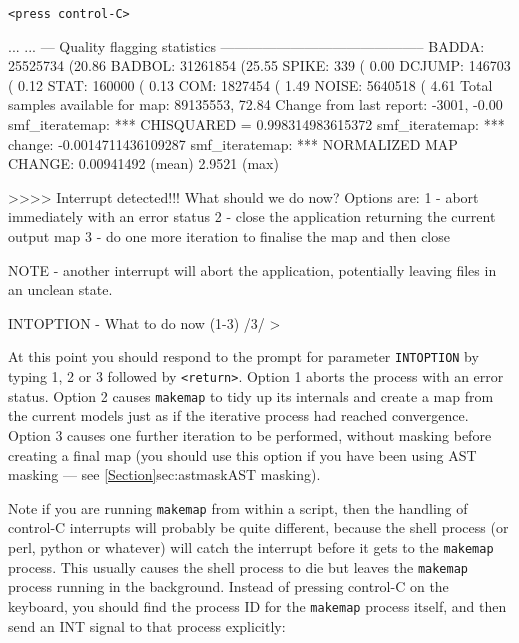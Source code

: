\begin{terminalv}
\texttt{<press control-C>}

\begin{terminalv}
...
...
--- Quality flagging statistics
--------------------------------------------
 BADDA:   25525734 (20.86%
BADBOL:   31261854 (25.55%
 SPIKE:        339 ( 0.00%
DCJUMP:     146703 ( 0.12%
  STAT:     160000 ( 0.13%
   COM:    1827454 ( 1.49%
 NOISE:    5640518 ( 4.61%
Total samples available for map:   89135553, 72.84%
     Change from last report:      -3001, -0.00%
smf_iteratemap: *** CHISQUARED = 0.998314983615372
smf_iteratemap: *** change: -0.0014711436109287
smf_iteratemap: *** NORMALIZED MAP CHANGE: 0.00941492 (mean) 2.9521 (max)


>>>> Interrupt detected!!! What should we do now? Options are:
1 - abort immediately with an error status
2 - close the application returning the current output map
3 - do one more iteration to finalise the map and then close

NOTE - another interrupt will abort the application, potentially leaving
files in an unclean state.

INTOPTION - What to do now (1-3) /3/ >
\end{terminalv}

At this point you should respond to the prompt for parameter
\texttt{INTOPTION} by typing 1, 2 or 3 followed by \texttt{<return>}. Option
1 aborts the process with an error status. Option 2
 causes \texttt{makemap} to tidy up its internals and create a map
from the current models just as if the iterative process had reached
convergence. Option 3 causes one further iteration to be performed,
without masking before creating a final map
(you should use this option if you have been using AST
masking --- see \cref{Section}{sec:astmask}{AST masking}).

\begin{tip}
Note if you are running \texttt{makemap} from within a script, then the
handling of control-C interrupts will probably be quite different, because
the shell process (or perl, python or whatever) will catch the interrupt
before it gets to the \texttt{makemap} process. This usually causes the
shell process to die but leaves the \texttt{makemap} process running in
the background. Instead of pressing control-C on the keyboard, you should
find the process ID for the \texttt{makemap} process itself, and then send an
INT signal to that process explicitly:


\end{tip}
\end{terminalv}
